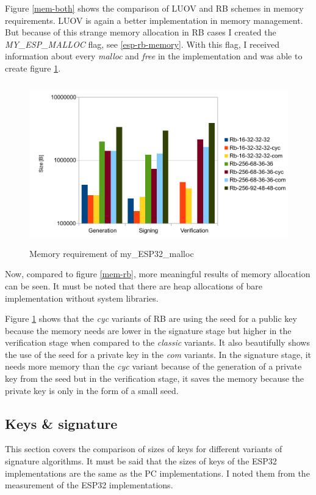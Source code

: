 \documentclass[thesis=M,english]{FITthesis}[2019/12/23]
\begin{document}
\noindent
Figure \ref{mem-both} shows the comparison of LUOV and RB schemes in memory requirements. LUOV is again a better implementation in memory management. But because of this strange memory allocation in RB cases I created the \textit{MY\_ESP\_MALLOC} flag, see \ref{esp-rb-memory}. With this flag, I received information about every \textit{malloc} and \textit{free} in the implementation and was able to create figure \ref{mem-my-alloc}.

\begin{figure}[H]
\centering
\includegraphics[width=13cm,height=7cm]{images/mem-my_esp_malloc.pdf}
\caption{Memory requirement of my\_ESP32\_malloc}
\label{mem-my-alloc}
\end{figure}

\noindent
Now, compared to figure \ref{mem-rb}, more meaningful results of memory allocation can be seen. It must be noted that there are heap allocations of bare implementation without system libraries.

\bigskip
\noindent
Figure \ref{mem-my-alloc} shows that the \textit{cyc} variants of RB are using the seed for a public key because the memory needs are lower in the signature stage but higher in the verification stage when compared to the \textit{classic} variants. It also beautifully shows the use of the seed for a private key in the \textit{com} variants. In the signature stage, it needs more memory than the \textit{cyc} variant because of the generation of a private key from the seed but in the verification stage, it saves the memory because the private key is only in the form of a small seed.

\subsection{Keys \& signature} \label{key_sign}
This section covers the comparison of sizes of keys for different variants of signature algorithms. It must be said that the sizes of keys of the ESP32 implementations are the same as the PC implementations. I noted them from the measurement of the ESP32 implementations.
\end{document}
